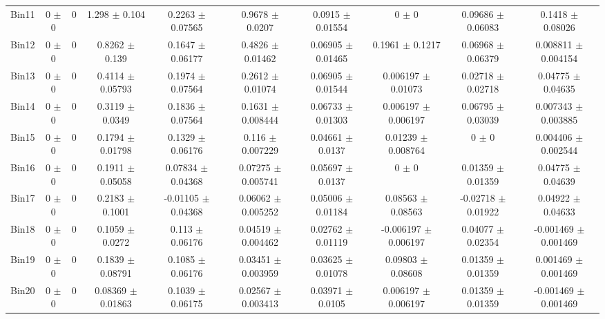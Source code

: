 \begin{tabular}{@{\extracolsep{4pt}}lccccccccc@{}}
     Bin11 & 0 $\pm$ 0 & 0 & 1.298 $\pm$ 0.104 & 0.2263 $\pm$ 0.07565 & 0.9678 $\pm$ 0.0207 & 0.0915 $\pm$ 0.01554 & 0 $\pm$ 0 & 0.09686 $\pm$ 0.06083 & 0.1418 $\pm$ 0.08026 \\ 
     Bin12 & 0 $\pm$ 0 & 0 & 0.8262 $\pm$ 0.139 & 0.1647 $\pm$ 0.06177 & 0.4826 $\pm$ 0.01462 & 0.06905 $\pm$ 0.01465 & 0.1961 $\pm$ 0.1217 & 0.06968 $\pm$ 0.06379 & 0.008811 $\pm$ 0.004154 \\ 
     Bin13 & 0 $\pm$ 0 & 0 & 0.4114 $\pm$ 0.05793 & 0.1974 $\pm$ 0.07564 & 0.2612 $\pm$ 0.01074 & 0.06905 $\pm$ 0.01544 & 0.006197 $\pm$ 0.01073 & 0.02718 $\pm$ 0.02718 & 0.04775 $\pm$ 0.04635 \\ 
     Bin14 & 0 $\pm$ 0 & 0 & 0.3119 $\pm$ 0.0349 & 0.1836 $\pm$ 0.07564 & 0.1631 $\pm$ 0.008444 & 0.06733 $\pm$ 0.01303 & 0.006197 $\pm$ 0.006197 & 0.06795 $\pm$ 0.03039 & 0.007343 $\pm$ 0.003885 \\ 
     Bin15 & 0 $\pm$ 0 & 0 & 0.1794 $\pm$ 0.01798 & 0.1329 $\pm$ 0.06176 & 0.116 $\pm$ 0.007229 & 0.04661 $\pm$ 0.0137 & 0.01239 $\pm$ 0.008764 & 0 $\pm$ 0 & 0.004406 $\pm$ 0.002544 \\ 
     Bin16 & 0 $\pm$ 0 & 0 & 0.1911 $\pm$ 0.05058 & 0.07834 $\pm$ 0.04368 & 0.07275 $\pm$ 0.005741 & 0.05697 $\pm$ 0.0137 & 0 $\pm$ 0 & 0.01359 $\pm$ 0.01359 & 0.04775 $\pm$ 0.04639 \\ 
     Bin17 & 0 $\pm$ 0 & 0 & 0.2183 $\pm$ 0.1001 & -0.01105 $\pm$ 0.04368 & 0.06062 $\pm$ 0.005252 & 0.05006 $\pm$ 0.01184 & 0.08563 $\pm$ 0.08563 & -0.02718 $\pm$ 0.01922 & 0.04922 $\pm$ 0.04633 \\ 
     Bin18 & 0 $\pm$ 0 & 0 & 0.1059 $\pm$ 0.0272 & 0.113 $\pm$ 0.06176 & 0.04519 $\pm$ 0.004462 & 0.02762 $\pm$ 0.01119 & -0.006197 $\pm$ 0.006197 & 0.04077 $\pm$ 0.02354 & -0.001469 $\pm$ 0.001469 \\ 
     Bin19 & 0 $\pm$ 0 & 0 & 0.1839 $\pm$ 0.08791 & 0.1085 $\pm$ 0.06176 & 0.03451 $\pm$ 0.003959 & 0.03625 $\pm$ 0.01078 & 0.09803 $\pm$ 0.08608 & 0.01359 $\pm$ 0.01359 & 0.001469 $\pm$ 0.001469 \\ 
     Bin20 & 0 $\pm$ 0 & 0 & 0.08369 $\pm$ 0.01863 & 0.1039 $\pm$ 0.06175 & 0.02567 $\pm$ 0.003413 & 0.03971 $\pm$ 0.0105 & 0.006197 $\pm$ 0.006197 & 0.01359 $\pm$ 0.01359 & -0.001469 $\pm$ 0.001469 \\ 
\hline\hline
  \end{tabular}
